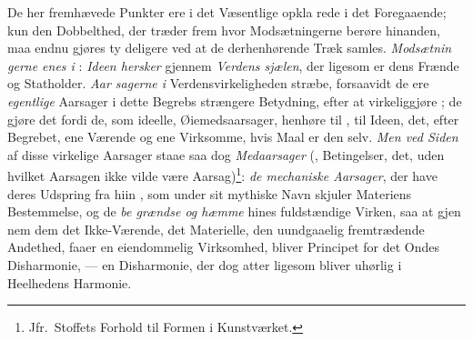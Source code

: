 De her fremhævede Punkter ere i det Væsentlige opkla\-%
rede i det Foregaaende; kun den Dobbelthed, der træder frem
hvor Modsætningerne berøre hinanden, maa endnu gjøres ty\-%
deligere ved at de derhenhørende Træk samles. \emph{Modsætnin\-%
gerne enes i} : \emph{Ideen hersker} gjennem \emph{Verdens\-%
sjælen}, der ligesom er dens Frænde og Statholder. \emph{Aar\-%
sagerne i} Verdensvirkeligheden stræbe, forsaavidt de ere
\emph{egentlige} Aarsager i dette Begrebs strængere Betydning, efter
at virkeliggjøre ; de gjøre det fordi de,
 \setcounter{footnote}{0}
som ideelle, Øiemedsaarsager, henhøre til , til Ideen, det,
efter Begrebet, ene Værende og ene Virksomme, hvis Maal er
den selv. \emph{Men ved Siden} af disse virkelige Aarsager staae
saa dog \emph{Medaarsager} (, Betingelser, det, uden
hvilket Aarsagen ikke vilde være Aarsag)\footnote{Jfr.\ Stoffets Forhold
til Formen i Kunstværket.}: \emph{de mechaniske
Aarsager}, der have deres Udspring fra hiin , som under
sit mythiske Navn skjuler Materiens Bestemmelse, og de \emph{be\-%
grændse og hæmme} hines fuldstændige Virken, saa at gjen\-%
nem dem det Ikke-Værende, det Materielle, den uundgaaelig
fremtrædende Andethed, faaer en eiendommelig Virksomhed,
bliver Principet for det Ondes Disharmonie, --- en Disharmonie,
der dog atter ligesom bliver uhørlig i Heelhedens Harmonie.

